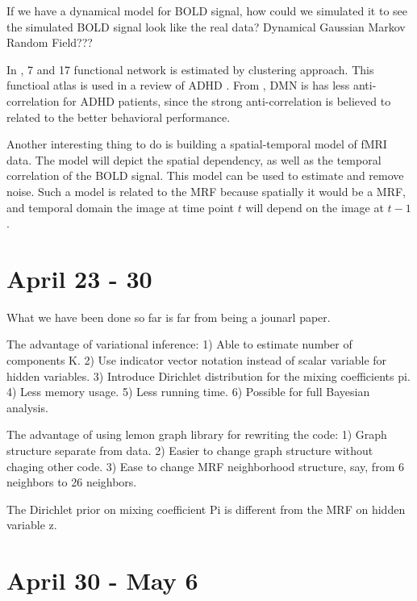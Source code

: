 \documentclass[12pt]{article}
\begin{document}
If we have a dynamical model for BOLD signal, how could we simulated it to see
the simulated BOLD signal look like the real data? Dynamical Gaussian Markov
Random Field???

In \cite{yeo2011organization}, 7 and 17 functional network is estimated by
clustering approach. This functioal atlas is used in a review of ADHD
\citep{castellanos2011large}. From \citeauthor{castellanos2011large}, DMN is has
less anti-correlation for ADHD patients, since the strong anti-correlation is
believed to related to the better behavioral performance.

Another interesting thing to do is building a spatial-temporal model of fMRI
data. The model will depict the spatial dependency, as well as the temporal
correlation of the BOLD signal. This model can be used to estimate and remove
noise. Such a model is related to the MRF because spatially it would be a MRF,
and temporal domain the image at time point $t$ will depend on the image at
$t-1$.

\section{April 23 - 30}
What we have been done so far is far from being a jounarl paper. 

The advantage of variational inference: 1) Able to estimate number of components
K. 2) Use indicator vector notation instead of scalar variable for hidden
variables. 3) Introduce Dirichlet distribution for the mixing coefficients
pi. 4) Less memory usage. 5) Less running time. 6) Possible for full Bayesian
analysis.

The advantage of using \textsf{lemon} graph library for rewriting the code: 1)
Graph structure separate from data. 2) Easier to change graph structure without
chaging other code. 3) Ease to change MRF neighborhood structure, say, from 6
neighbors to 26 neighbors.

The Dirichlet prior on mixing coefficient Pi is different from the MRF on hidden variable z.

\section{April 30 - May 6}
\end{document}
